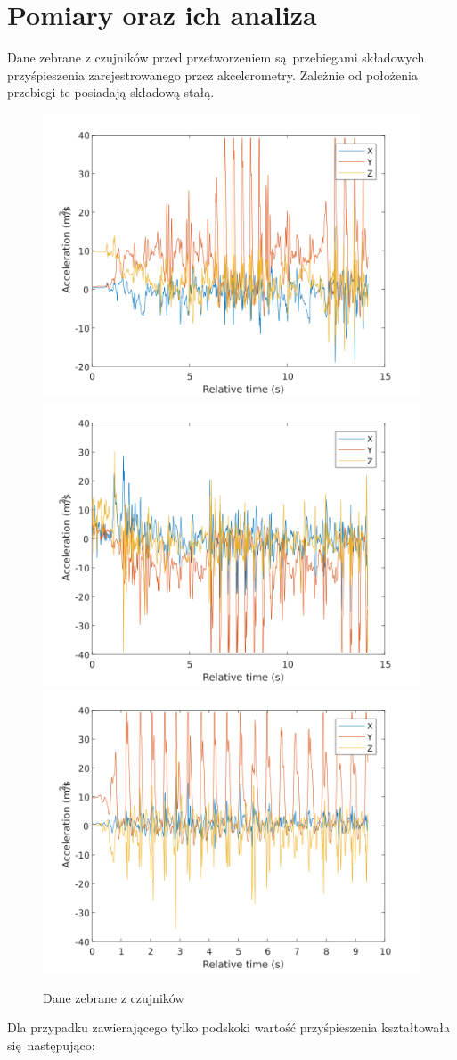 \documentclass[a4paper, 12pt, titlepage]{article}
\begin{document}
    \section{Pomiary oraz ich analiza}
        Dane zebrane z czujników przed przetworzeniem są przebiegami
        składowych przyśpieszenia zarejestrowanego przez akcelerometry.
        Zależnie od położenia przebiegi te posiadają składową stałą.
        \begin{figure}[H]
            \centering
            \includegraphics[width=0.49\columnwidth]
                {krok_dziala1g.png}
            \includegraphics[width=0.49\columnwidth]
                {krok_dziala2b.png}
            \includegraphics[width=0.49\columnwidth]
                {skok1_a.png}
            \caption{Dane zebrane z czujników}
        \end{figure}\noindent
        Dla przypadku zawierającego tylko podskoki wartość
        przyśpieszenia kształtowała się następująco:
\end{document}

